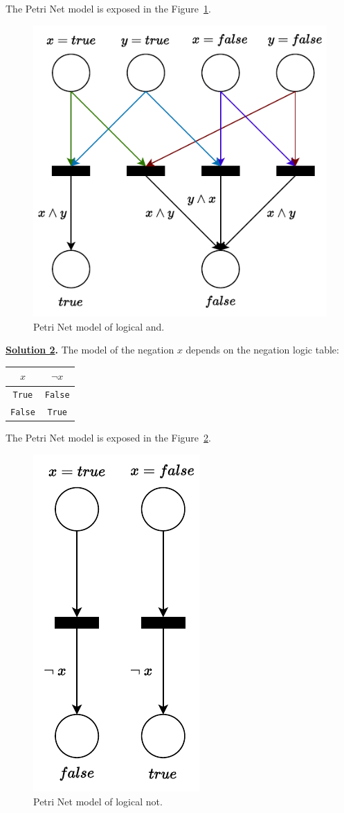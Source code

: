 \noindent
The Petri Net model is exposed in the Figure~\ref{fig: exercises - logical and}.

\begin{figure}[!htp]
    \centering
    \includegraphics[width=.7\textwidth]{img/logical-and-1.pdf}
    \caption{Petri Net model of logical and.}
    \label{fig: exercises - logical and}
\end{figure}

\highspace
\textbf{\underline{Solution 2}.} The model of the negation $x$ depends on the negation logic table:

\begin{table}[!htp]
    \centering
    \begin{tabular}{@{} c c @{}}
        \toprule
        $x$ & $\lnot x$ \\
        \midrule
        \texttt{True} & \texttt{False} \\
        \texttt{False} & \texttt{True} \\
        \bottomrule
    \end{tabular}
\end{table}

\noindent
The Petri Net model is exposed in the Figure~\ref{fig: exercises - logical not}.

\begin{figure}[!htp]
    \centering
    \includegraphics[width=.35\textwidth]{img/logical-and-2.pdf}
    \caption{Petri Net model of logical not.}
    \label{fig: exercises - logical not}
\end{figure}

